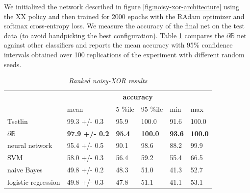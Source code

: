 \documentclass{article} %
\begin{document}
We initialized the network described in figure \ref{fig:noisy-xor-architecture} using the XX policy and then trained for 2000 epochs with the RAdam optimizer \citep{Liu2020On} and softmax cross-entropy loss. We measure the accuracy of the final net on the test data (to avoid handpicking the best configuration). Table \ref{tab:noisy-xor-results} compares the $\partial\mathbb{B}$ net against other classifiers \citep{granmo18} and reports the mean accuracy with 95\% confidence intervals obtained over 100 replications of the experiment with different random seeds. 

\begin{table}[h]
	\centering
	\begin{tabular}{llllll}
		\cline{2-6}
		\multicolumn{1}{c}{}                       & \multicolumn{5}{c}{\textbf{accuracy}}                                                                                                                                                            \\ \cline{2-6} 
		\multicolumn{1}{l|}{}                      & \multicolumn{1}{l|}{mean}                  & \multicolumn{1}{l|}{5 \%ile}       & \multicolumn{1}{l|}{95 \%ile}       & \multicolumn{1}{l|}{min}           & \multicolumn{1}{l|}{max}            \\ \hline
		\multicolumn{1}{|l|}{Tsetlin}              & \multicolumn{1}{l|}{99.3 +/- 0.3}          & \multicolumn{1}{l|}{95.9}          & \multicolumn{1}{l|}{100.0}          & \multicolumn{1}{l|}{91.6}          & \multicolumn{1}{l|}{100.0}          \\ \hline
		\multicolumn{1}{|l|}{$\partial\mathbb{B}$} & \multicolumn{1}{l|}{\textbf{97.9 +/- 0.2}} & \multicolumn{1}{l|}{\textbf{95.4}} & \multicolumn{1}{l|}{\textbf{100.0}} & \multicolumn{1}{l|}{\textbf{93.6}} & \multicolumn{1}{l|}{\textbf{100.0}} \\ \hline
		\multicolumn{1}{|l|}{neural network}       & \multicolumn{1}{l|}{95.4 +/- 0.5}          & \multicolumn{1}{l|}{90.1}          & \multicolumn{1}{l|}{98.6}           & \multicolumn{1}{l|}{88.2}          & \multicolumn{1}{l|}{99.9}           \\ \hline
		\multicolumn{1}{|l|}{SVM}                  & \multicolumn{1}{l|}{58.0 +/- 0.3}          & \multicolumn{1}{l|}{56.4}          & \multicolumn{1}{l|}{59.2}           & \multicolumn{1}{l|}{55.4}          & \multicolumn{1}{l|}{66.5}           \\ \hline
		\multicolumn{1}{|l|}{naive Bayes}          & \multicolumn{1}{l|}{49.8 +/- 0.2}          & \multicolumn{1}{l|}{48.3}          & \multicolumn{1}{l|}{51.0}           & \multicolumn{1}{l|}{41.3}          & \multicolumn{1}{l|}{52.7}           \\ \hline
		\multicolumn{1}{|l|}{logistic regression}  & \multicolumn{1}{l|}{49.8 +/- 0.3}          & \multicolumn{1}{l|}{47.8}          & \multicolumn{1}{l|}{51.1}           & \multicolumn{1}{l|}{41.1}          & \multicolumn{1}{l|}{53.1}           \\ \hline
	\end{tabular}
	\caption{{\em Ranked noisy-XOR results}}
	\label{tab:noisy-xor-results}
\end{table}
\end{document}
